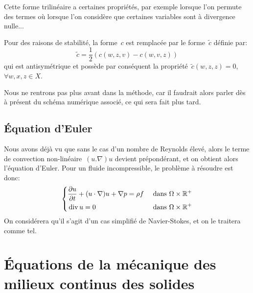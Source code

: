 \medskip
Cette forme trilinéaire a certaines propriétés, par exemple lorsque l'on permute des termes où lorsque l'on considère que certaines variables sont à divergence nulle...

\medskip
Pour des raisons de stabilité, la forme~$c$ est remplacée par le forme~$\tilde{c}$ définie par:
\begin{equation}
\tilde{c} = \dfrac12 \left(c(w,z,v)-c(w,v,z)\right)
\end{equation}
qui est antisymétrique et possède par conséquent la propriété~$\tilde{c}(w,z,z)=0$,
$\forall w,x,z \in X$.

Nous ne rentrons pas plus avant dans la méthode, car il faudrait alors parler dès à présent du schéma numérique associé, ce qui sera fait plus tard.

\medskip
\subsection{Équation d'Euler}
Nous avons déjà vu que sans le cas d'un nombre de Reynolds élevé, alors le terme de convection non-linéaire~$(u.\nabla)u$ devient prépondérant, et on obtient alors l'équation d'Euler. Pour un fluide incompressible, le problème à résoudre est donc:
\begin{equation}\left\{
\begin{aligned}
&\dfrac{\partial u}{\partial t} + (u\cdot\nabla) u + \nabla p = \rho f && \text{ dans } \Omega\times\mathbb R^+\\
&\operatorname{div} u = 0&& \text{ dans } \Omega\times\mathbb R^+
\end{aligned}\right.
\end{equation}
On considérera qu'il s'agit d'un cas simplifié de Navier-Stokes, et on le traitera comme tel.

\medskip
\section{Équations de la mécanique des milieux continus des solides}
\medskip

